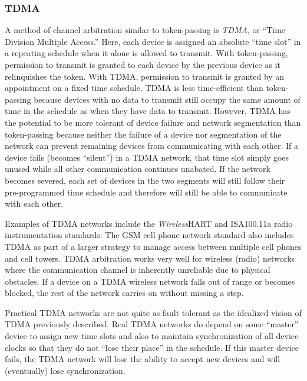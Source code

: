 \filbreak
\subsubsection{TDMA}

A method of channel arbitration similar to token-passing is \textit{TDMA}, or ``Time Division Multiple Access.''  Here, each device is assigned an absolute ``time slot'' in a repeating schedule when it alone is allowed to transmit.  With token-passing, permission to transmit is granted to each device by the previous device as it relinquishes the token.  With TDMA, permission to transmit is granted by an appointment on a fixed time schedule.  TDMA is less time-efficient than token-passing because devices with no data to transmit still occupy the same amount of time in the schedule as when they have data to transmit.  However, TDMA has the potential to be more tolerant of device failure and network segmentation than token-passing because neither the failure of a device nor segmentation of the network can prevent remaining devices from communicating with each other.  If a device fails (becomes ``silent'') in a TDMA network, that time slot simply goes unused while all other communication continues unabated.  If the network becomes severed, each set of devices in the two segments will still follow their pre-programmed time schedule and therefore will still be able to communicate with each other.     

Examples of TDMA networks include the \textsl{Wireless}HART and ISA100.11a radio instrumentation standards.  The GSM cell phone network standard also includes TDMA as part of a larger strategy to manage access between multiple cell phones and cell towers.  TDMA arbitration works very well for wireless (radio) networks where the communication channel is inherently unreliable due to physical obstacles.  If a device on a TDMA wireless network falls out of range or becomes blocked, the rest of the network carries on without missing a step.    

\vskip 10pt

Practical TDMA networks are not quite as fault tolerant as the idealized vision of TDMA previously described.  Real TDMA networks do depend on some ``master'' device to assign new time slots and also to maintain synchronization of all device clocks so that they do not ``lose their place'' in the schedule.  If this master device fails, the TDMA network will lose the ability to accept new devices and will (eventually) lose synchronization.

